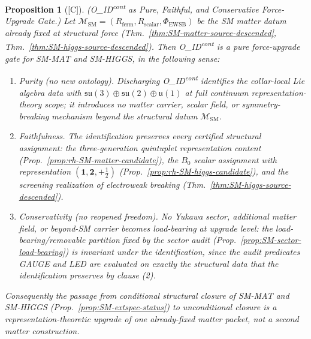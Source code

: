 \documentclass[12pt,oneside]{amsbook}
\theoremstyle{plain}
\newtheorem{proposition}[theorem]{Proposition}
\theoremstyle{definition}
\theoremstyle{remark}
\newcommand{\status}[1]{\textup{[#1]}}
\begin{document}
\begin{proposition}[\status{C}]\label{prop:SM-IDcont-force-upgrade}
\textup{(O\_ID\textsuperscript{cont} as Pure, Faithful, and
Conservative Force-Upgrade Gate.)}
Let $\mathcal{M}_{\mathrm{SM}} = (R_{\mathrm{ferm}},
R_{\mathrm{scalar}}, \Phi_{\mathrm{EWSB}})$ be the SM matter datum
already fixed at structural force
(Thm.~\ref{thm:SM-matter-source-descended},
Thm.~\ref{thm:SM-higgs-source-descended}). Then
O\_ID\textsuperscript{cont} is a \emph{pure force-upgrade gate} for
SM-MAT and SM-HIGGS, in the following sense:
\begin{enumerate}[label=\textup{(\arabic*)}]
  \item \emph{Purity (no new ontology).} Discharging
  O\_ID\textsuperscript{cont} identifies the collar-local Lie
  algebra data with $\mathfrak{su}(3)\oplus\mathfrak{su}(2)\oplus
  \mathfrak{u}(1)$ at full continuum representation-theory scope;
  it introduces no matter carrier, scalar field, or
  symmetry-breaking mechanism beyond the structural datum
  $\mathcal{M}_{\mathrm{SM}}$.
  \item \emph{Faithfulness.} The identification preserves every
  certified structural assignment: the three-generation quintuplet
  representation content
  (Prop.~\ref{prop:rh-SM-matter-candidate}), the $B_0$ scalar
  assignment with representation $(\mathbf{1},\mathbf{2},+\tfrac12)$
  (Prop.~\ref{prop:rh-SM-higgs-candidate}), and the screening
  realization of electroweak breaking
  (Thm.~\ref{thm:SM-higgs-source-descended}).
  \item \emph{Conservativity (no reopened freedom).} No Yukawa
  sector, additional matter field, or beyond-SM carrier becomes
  load-bearing at upgrade level: the load-bearing/removable
  partition fixed by the sector audit
  (Prop.~\ref{prop:SM-sector-load-bearing}) is invariant under
  the identification, since the audit predicates GAUGE and LED
  are evaluated on exactly the structural data that the
  identification preserves by clause (2).
\end{enumerate}
Consequently the passage from conditional structural closure of
SM-MAT and SM-HIGGS (Prop.~\ref{prop:SM-extspec-status}) to
unconditional closure is a representation-theoretic upgrade of one
already-fixed matter packet, not a second matter construction.
\end{proposition}
\end{document}

